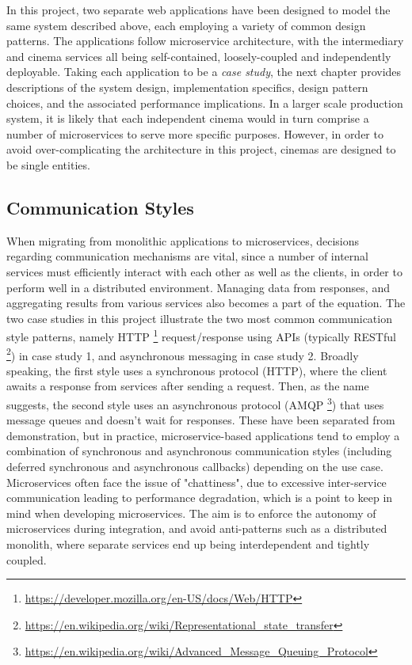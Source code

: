 In this project, two separate web applications have been designed to model the same system described above, each employing a variety of common design patterns. The applications follow microservice architecture, with the intermediary and cinema services all being self-contained, loosely-coupled and independently deployable. Taking each application to be a \textit{case study}, the next chapter provides descriptions of the system design, implementation specifics, design pattern choices, and the associated performance implications. In a larger scale production system, it is likely that each independent cinema would in turn comprise a number of microservices to serve more specific purposes. However, in order to avoid over-complicating the architecture in this project, cinemas are designed to be single entities.

\subsection{Communication Styles}

When migrating from monolithic applications to microservices, decisions regarding communication mechanisms are vital, since a number of internal services must efficiently interact with each other as well as the clients, in order to perform well in a distributed environment. Managing data from responses, and aggregating results from various services also becomes a part of the equation. The two case studies in this project illustrate the two most common communication style patterns, namely HTTP \footnote{\url{https://developer.mozilla.org/en-US/docs/Web/HTTP}} request/response using APIs (typically RESTful \footnote{\url{https://en.wikipedia.org/wiki/Representational_state_transfer}}) in case study 1, and asynchronous messaging in case study 2. Broadly speaking, the first style uses a synchronous protocol (HTTP), where the client awaits a response from services after sending a request. Then, as the name suggests, the second style uses an asynchronous protocol (AMQP \footnote{\url{https://en.wikipedia.org/wiki/Advanced_Message_Queuing_Protocol}}) that uses message queues and doesn't wait for responses. These have been separated from demonstration, but in practice, microservice-based applications tend to employ a combination of synchronous and asynchronous communication styles (including deferred synchronous and asynchronous callbacks) depending on the use case. Microservices often face the issue of "chattiness", due to excessive inter-service communication leading to performance degradation, which is a point to keep in mind when developing microservices. The aim is to enforce the autonomy of microservices during integration, and avoid anti-patterns such as a distributed monolith, where separate services end up being interdependent and tightly coupled.

